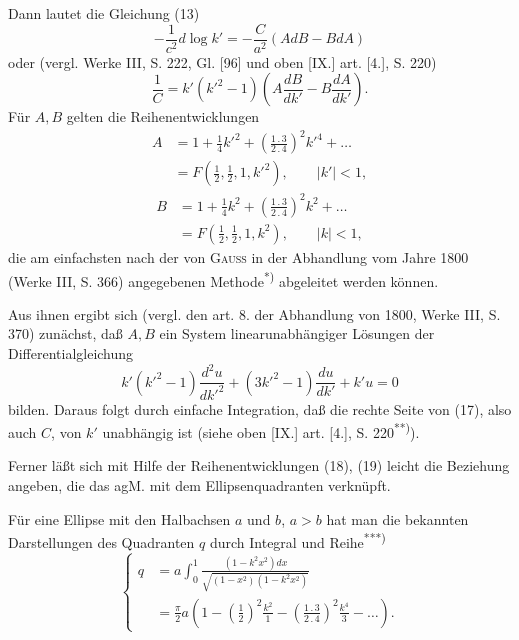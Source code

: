 \noindent Dann lautet die Gleichung (13)
\[-\frac1{c^2}d\log k'=-\frac C{a^2}(AdB-BdA)\]
\noindent oder (vergl. Werke III, S. 222, Gl. [96] und oben [IX.] art. [4.], S. 220)
\begin{equation*}\tag*{(17)}\frac1C=k'(k'^2-1)\left(A\frac{dB}{dk'}-B\frac{dA}{dk'}\right).\end{equation*}
\noindent Für $A,B$ gelten die Reihenentwicklungen
\begin{equation*}\tag*{(18)}
\begin{aligned}
A&=1+\frac14k'^2+\left(\frac{1\, .\,3}{2\, .\,4}\right)^2k'^4+\ldots\\
&=F\left(\frac12,\frac12,1,k'^2\right),\qquad |k'|<1,
\end{aligned}
\end{equation*}
\begin{equation*}\tag*{(19)}
\begin{aligned}
B&=1+\frac14k^2+\left(\frac{1\, .\,3}{2\, .\,4}\right)^2k^2+\ldots\\
&=F\left(\frac12,\frac12,1,k^2\right),\qquad |k|<1,
\end{aligned}
\end{equation*}
\noindent die am einfachsten nach der von \textsc{Gauss} in der Abhandlung vom Jahre 1800 (Werke III, S. 366) angegebenen Methode\textsuperscript{*)} abgeleitet werden können.
\par\indent Aus ihnen ergibt sich (vergl. den art. 8. der Abhandlung von 1800, Werke III, S. 370) zunächst, daß $A,B$ ein System linearunabhängiger Lösungen der Differentialgleichung
\begin{equation*}\tag*{(20)}k'(k'^2-1)\frac{d^2u}{dk'^2}+(3k'^2-1)\frac{du}{dk'}+k'u=0\end{equation*}
\noindent bilden. Daraus folgt durch einfache Integration, daß die rechte Seite von (17), also auch $C$, von $k'$ unabhängig ist (siehe oben [IX.] art. [4.], S. 220\textsuperscript{**)}).
\par\indent Ferner läßt sich mit Hilfe der Reihenentwicklungen (18), (19) leicht die Beziehung angeben, die das agM. mit dem Ellipsenquadranten verknüpft.
\par\indent Für eine Ellipse mit den Halbachsen $a$ und $b$, $a>b$ hat man die bekannten Darstellungen des Quadranten $q$ durch Integral und Reihe\textsuperscript{***)}
\begin{equation*}\tag*{(21)}
\left\{\begin{aligned}
q&=a\int_0^1\frac{(1-k^2x^2)dx}{\sqrt{(1-x^2)(1-k^2x^2)}}\\[4pt]
&=\frac\pi2a\left(1-\left(\frac12\right)^2\frac{k^2}1-\left(\frac{1\, .\,3}{2\, .\,4}\right)^2\frac{k^4}3-\ldots\right).
\end{aligned}\right.
\end{equation*}
